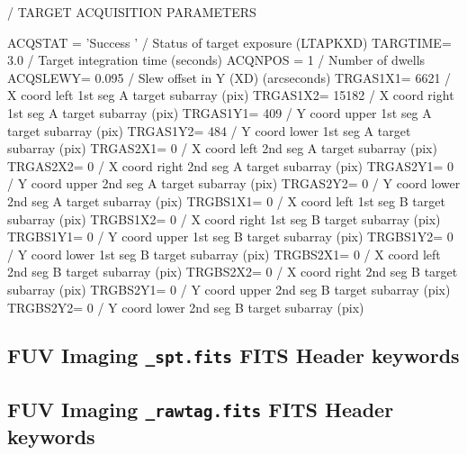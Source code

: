 {              / TARGET ACQUISITION PARAMETERS

ACQSTAT = 'Success '           / Status of target exposure (LTAPKXD)
TARGTIME=                  3.0 / Target integration time (seconds)
ACQNPOS =                    1 / Number of dwells
ACQSLEWY=                0.095 / Slew offset in Y (XD) (arcseconds)
TRGAS1X1=                 6621 / X coord left  1st seg A target subarray (pix)
TRGAS1X2=                15182 / X coord right 1st seg A target subarray (pix)
TRGAS1Y1=                  409 / Y coord upper 1st seg A target subarray (pix)
TRGAS1Y2=                  484 / Y coord lower 1st seg A target subarray (pix)
TRGAS2X1=                    0 / X coord left  2nd seg A target subarray (pix)
TRGAS2X2=                    0 / X coord right 2nd seg A target subarray (pix)
TRGAS2Y1=                    0 / Y coord upper 2nd seg A target subarray (pix)
TRGAS2Y2=                    0 / Y coord lower 2nd seg A target subarray (pix)
TRGBS1X1=                    0 / X coord left  1st seg B target subarray (pix)
TRGBS1X2=                    0 / X coord right 1st seg B target subarray (pix)
TRGBS1Y1=                    0 / Y coord upper 1st seg B target subarray (pix)
TRGBS1Y2=                    0 / Y coord lower 1st seg B target subarray (pix)
TRGBS2X1=                    0 / X coord left  2nd seg B target subarray (pix)
TRGBS2X2=                    0 / X coord right 2nd seg B target subarray (pix)
TRGBS2Y1=                    0 / Y coord upper 2nd seg B target subarray (pix)
TRGBS2Y2=                    0 / Y coord lower 2nd seg B target subarray (pix)
}

\subsection{FUV Imaging \texttt{\_spt.fits} FITS Header keywords}\label{subsec:FsptSUB}
\subsection{FUV Imaging \texttt{\_rawtag.fits} FITS Header keywords}\label{subsec:FfitsSUB}

